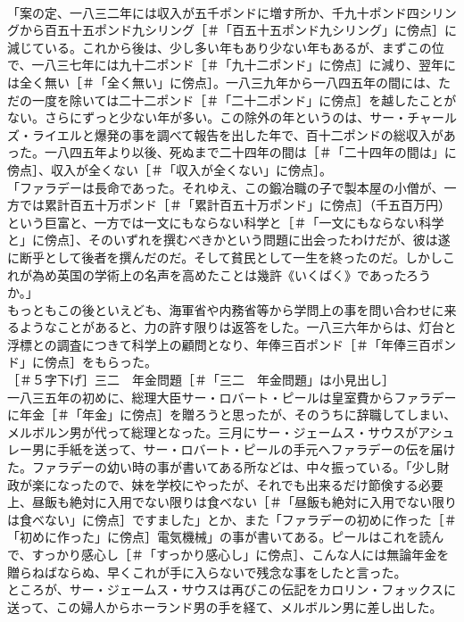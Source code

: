 \documentclass[8pt]{extreport}
\begin{document}
\begin{CJK}{UTF8}{min}
\\	「案の定、一八三二年には収入が五千ポンドに増す所か、千九十ポンド四シリングから百五十五ポンド九シリング［＃「百五十五ポンド九シリング」に傍点］に減じている。これから後は、少し多い年もあり少ない年もあるが、まずこの位で、一八三七年には九十二ポンド［＃「九十二ポンド」に傍点］に減り、翌年には全く無い［＃「全く無い」に傍点］。一八三九年から一八四五年の間には、ただの一度を除いては二十二ポンド［＃「二十二ポンド」に傍点］を越したことがない。さらにずっと少ない年が多い。この除外の年というのは、サー・チャールズ・ライエルと爆発の事を調べて報告を出した年で、百十二ポンドの総収入があった。一八四五年より以後、死ぬまで二十四年の間は［＃「二十四年の間は」に傍点］、収入が全くない［＃「収入が全くない」に傍点］。
\\	「ファラデーは長命であった。それゆえ、この鍛冶職の子で製本屋の小僧が、一方では累計百五十万ポンド［＃「累計百五十万ポンド」に傍点］（千五百万円）という巨富と、一方では一文にもならない科学と［＃「一文にもならない科学と」に傍点］、そのいずれを撰むべきかという問題に出会ったわけだが、彼は遂に断乎として後者を撰んだのだ。そして貧民として一生を終ったのだ。しかしこれが為め英国の学術上の名声を高めたことは幾許《いくばく》であったろうか。」
\\	もっともこの後といえども、海軍省や内務省等から学問上の事を問い合わせに来るようなことがあると、力の許す限りは返答をした。一八三六年からは、灯台と浮標との調査につきて科学上の顧問となり、年俸三百ポンド［＃「年俸三百ポンド」に傍点］をもらった。
\\	［＃５字下げ］三二　年金問題［＃「三二　年金問題」は小見出し］
\\	一八三五年の初めに、総理大臣サー・ロバート・ピールは皇室費からファラデーに年金［＃「年金」に傍点］を贈ろうと思ったが、そのうちに辞職してしまい、メルボルン男が代って総理となった。三月にサー・ジェームス・サウスがアシュレー男に手紙を送って、サー・ロバート・ピールの手元へファラデーの伝を届けた。ファラデーの幼い時の事が書いてある所などは、中々振っている。「少し財政が楽になったので、妹を学校にやったが、それでも出来るだけ節倹する必要上、昼飯も絶対に入用でない限りは食べない［＃「昼飯も絶対に入用でない限りは食べない」に傍点］ですました」とか、また「ファラデーの初めに作った［＃「初めに作った」に傍点］電気機械」の事が書いてある。ピールはこれを読んで、すっかり感心し［＃「すっかり感心し」に傍点］、こんな人には無論年金を贈らねばならぬ、早くこれが手に入らないで残念な事をしたと言った。
\\	ところが、サー・ジェームス・サウスは再びこの伝記をカロリン・フォックスに送って、この婦人からホーランド男の手を経て、メルボルン男に差し出した。

\end{CJK}
\end{document}
